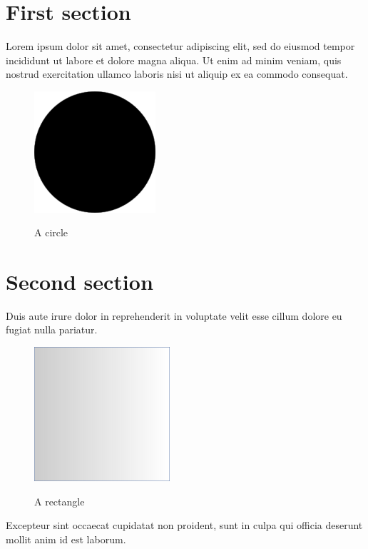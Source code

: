 \documentclass{article}
\begin{document}
    \section{First section}
        Lorem ipsum dolor sit amet, consectetur adipiscing elit, sed do eiusmod tempor incididunt ut labore et dolore magna aliqua. Ut enim ad minim veniam, quis nostrud exercitation ullamco laboris nisi ut aliquip ex ea commodo consequat\cite{PendegrassCatherineJane2012Teoa}.
        \begin{figure}[h]
        \centering
            \includegraphics[width=0.4\textwidth]{figures/circle.png}
        \label{fig:circle}
        \caption{A circle}
        \end{figure}

    \section{Second section}
        Duis aute irure dolor in reprehenderit in voluptate velit esse cillum dolore eu fugiat nulla pariatur\cite{Chimutengwende-GordonM2017Tive}. 
        
        \begin{figure}[h]
        \centering
            \includegraphics[scale=1]{figures/rectangle.png}
        \label{fig:rectangle}
        \caption{A rectangle}
        \end{figure}
        Excepteur sint occaecat cupidatat non proident, sunt in culpa qui officia deserunt mollit anim id est laborum. 
    
\end{document}
